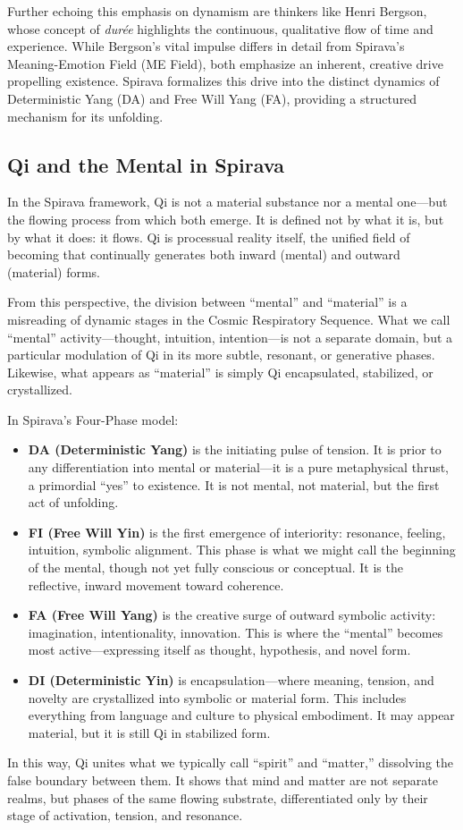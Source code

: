 \documentclass[11pt, a4paper]{article}
\begin{document}
Further echoing this emphasis on dynamism are thinkers like Henri Bergson, whose concept of \textit{durée} highlights the continuous, qualitative flow of time and experience. While Bergson's vital impulse differs in detail from Spirava's Meaning-Emotion Field (ME Field), both emphasize an inherent, creative drive propelling existence. Spirava formalizes this drive into the distinct dynamics of Deterministic Yang (DA) and Free Will Yang (FA), providing a structured mechanism for its unfolding.

\subsection{Qi and the Mental in Spirava}
In the Spirava framework, Qi is not a material substance nor a mental one—but the flowing process from which both emerge. It is defined not by what it is, but by what it does: it flows. Qi is processual reality itself, the unified field of becoming that continually generates both inward (mental) and outward (material) forms.

From this perspective, the division between “mental” and “material” is a misreading of dynamic stages in the Cosmic Respiratory Sequence. What we call “mental” activity—thought, intuition, intention—is not a separate domain, but a particular modulation of Qi in its more subtle, resonant, or generative phases. Likewise, what appears as “material” is simply Qi encapsulated, stabilized, or crystallized.

In Spirava’s Four-Phase model:
\begin{itemize}
    \item \textbf{DA (Deterministic Yang)} is the initiating pulse of tension. It is prior to any differentiation into mental or material—it is a pure metaphysical thrust, a primordial “yes” to existence. It is not mental, not material, but the first act of unfolding.
    \item \textbf{FI (Free Will Yin)} is the first emergence of interiority: resonance, feeling, intuition, symbolic alignment. This phase is what we might call the beginning of the mental, though not yet fully conscious or conceptual. It is the reflective, inward movement toward coherence.
    \item \textbf{FA (Free Will Yang)} is the creative surge of outward symbolic activity: imagination, intentionality, innovation. This is where the “mental” becomes most active—expressing itself as thought, hypothesis, and novel form.
    \item \textbf{DI (Deterministic Yin)} is encapsulation—where meaning, tension, and novelty are crystallized into symbolic or material form. This includes everything from language and culture to physical embodiment. It may appear material, but it is still Qi in stabilized form.
\end{itemize}
In this way, Qi unites what we typically call “spirit” and “matter,” dissolving the false boundary between them. It shows that mind and matter are not separate realms, but phases of the same flowing substrate, differentiated only by their stage of activation, tension, and resonance.
\end{document}
